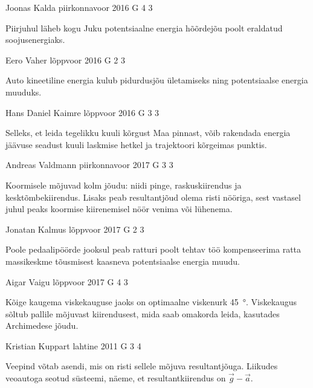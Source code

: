 \documentclass[11pt]{article}
\begin{document}
{%
{Joonas Kalda} %
{piirkonnavoor} %
{2016} %
{G 4} %
{3} %
{

\ifHint
Piirjuhul läheb kogu Juku potentsiaalne energia hõõrdejõu poolt eraldatud soojusenergiaks.
\fi
}

{Eero Vaher} %
{lõppvoor} %
{2016} %
{G 2} %
{3} %
{

\ifHint
Auto kineetiline energia kulub pidurdusjõu ületamiseks ning potentsiaalse energia muuduks.
\fi
}

{Hans Daniel Kaimre} %
{lõppvoor} %
{2016} %
{G 3} %
{3} %
{

\ifHint
Selleks, et leida tegelikku kuuli kõrgust Maa pinnast, võib rakendada energia jäävuse seadust kuuli laskmise hetkel ja trajektoori kõrgeimas punktis.
\fi
}

{Andreas Valdmann} %
{piirkonnavoor} %
{2017} %
{G 3} %
{3} %
{

\ifHint
Koormisele mõjuvad kolm jõudu: niidi pinge, raskuskiirendus ja kesktõmbekiirendus. Lisaks peab resultantjõud olema risti nööriga, sest vastasel juhul peaks koormise kiirenemisel nöör venima või lühenema.
\fi
}

{Jonatan Kalmus} %
{lõppvoor} %
{2017} %
{G 2} %
{3} %
{

\ifHint
Poole pedaalipöörde jooksul peab ratturi poolt tehtav töö kompenseerima ratta massikeskme tõusmisest kaasneva potentsiaalse energia muudu.
\fi
}

{Aigar Vaigu} %
{lõppvoor} %
{2017} %
{G 4} %
{3} %
{

\ifHint
Kõige kaugema viskekauguse jaoks on optimaalne viskenurk \SI{45}{\degree}. Viskekaugus sõltub pallile mõjuvast kiirendusest, mida saab omakorda leida, kasutades Archimedese jõudu.
\fi
}

{Kristian Kuppart} %
{lahtine} %
{2011} %
{G 3} %
{4} %
{

\ifHint
Veepind võtab asendi, mis on risti sellele mõjuva resultantjõuga. Liikudes veoautoga seotud süsteemi, näeme, et resultantkiirendus on $\vec g - \vec a$.
\fi
}

}
\end{document}
